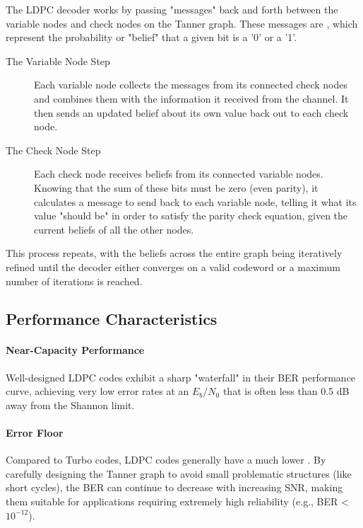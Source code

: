 The LDPC decoder works by passing "messages" back and forth between the variable nodes and check nodes on the Tanner graph. These messages are , which represent the probability or "belief" that a given bit is a '0' or a '1'.
\begin{description}
    \item[The Variable Node Step] Each variable node collects the messages from its connected check nodes and combines them with the information it received from the channel. It then sends an updated belief about its own value back out to each check node.
    \item[The Check Node Step] Each check node receives beliefs from its connected variable nodes. Knowing that the sum of these bits must be zero (even parity), it calculates a message to send back to each variable node, telling it what its value "should be" in order to satisfy the parity check equation, given the current beliefs of all the other nodes.
\end{description}
This process repeats, with the beliefs across the entire graph being iteratively refined until the decoder either converges on a valid codeword or a maximum number of iterations is reached.


\subsection{Performance Characteristics}

\paragraph{Near-Capacity Performance}
Well-designed LDPC codes exhibit a sharp "waterfall" in their BER performance curve, achieving very low error rates at an $E_b/N_0$ that is often less than 0.5 dB away from the Shannon limit.

\paragraph{Error Floor}
Compared to Turbo codes, LDPC codes generally have a much lower . By carefully designing the Tanner graph to avoid small problematic structures (like short cycles), the BER can continue to decrease with increasing SNR, making them suitable for applications requiring extremely high reliability (e.g., BER < $10^{-12}$).

